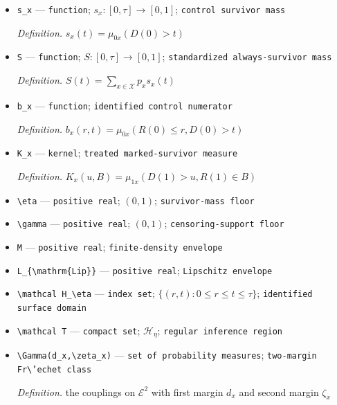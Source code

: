 \documentclass{article}
\begin{document}
\begin{itemize}
  \item \texttt{s\_\allowbreak{}x} --- \texttt{function}; \(s_x:[0,\tau]\to[0,1]\); \texttt{control survivor mass}
  \par\smallskip\noindent\emph{Definition.} \(s_x(t)=\mu_{0x}(D(0)>t)\)
  \item \texttt{S} --- \texttt{function}; \(S:[0,\tau]\to[0,1]\); \texttt{standardized always-\allowbreak{}survivor mass}
  \par\smallskip\noindent\emph{Definition.} \(S(t)=\sum_{x\in\mathcal X}p_xs_x(t)\)
  \item \texttt{b\_\allowbreak{}x} --- \texttt{function}; \texttt{identified control numerator}
  \par\smallskip\noindent\emph{Definition.} \(b_x(r,t)=\mu_{0x}(R(0)\le r,D(0)>t)\)
  \item \texttt{K\_\allowbreak{}x} --- \texttt{kernel}; \texttt{treated marked-\allowbreak{}survivor measure}
  \par\smallskip\noindent\emph{Definition.} \(K_x(u,B)=\mu_{1x}(D(1)>u,R(1)\in B)\)
  \item \texttt{\textbackslash{}\allowbreak{}eta} --- \texttt{positive real}; \((0,1)\); \texttt{survivor-\allowbreak{}mass floor}
  \item \texttt{\textbackslash{}\allowbreak{}gamma} --- \texttt{positive real}; \((0,1)\); \texttt{censoring-\allowbreak{}support floor}
  \item \texttt{M} --- \texttt{positive real}; \texttt{finite-\allowbreak{}density envelope}
  \item \texttt{L\_\allowbreak{}\{\textbackslash{}\allowbreak{}mathrm\{Lip\}\allowbreak{}\}\allowbreak{}} --- \texttt{positive real}; \texttt{Lipschitz envelope}
  \item \texttt{\textbackslash{}\allowbreak{}mathcal H\_\allowbreak{}\textbackslash{}\allowbreak{}eta} --- \texttt{index set}; \(\{(r,t):0\le r\le t\le\tau\}\); \texttt{identified surface domain}
  \item \texttt{\textbackslash{}\allowbreak{}mathcal T} --- \texttt{compact set}; \(\mathcal H_\eta\); \texttt{regular inference region}
  \item \texttt{\textbackslash{}\allowbreak{}Gamma(d\_\allowbreak{}x,\allowbreak{}\textbackslash{}\allowbreak{}zeta\_\allowbreak{}x)} --- \texttt{set of probability measures}; \texttt{two-\allowbreak{}margin Fr\textbackslash{}\allowbreak{}'echet class}
  \par\smallskip\noindent\emph{Definition.} the couplings on \(\mathcal E^2\) with first margin \(d_x\) and second margin \(\zeta_x\)

\end{itemize}
\end{document}
